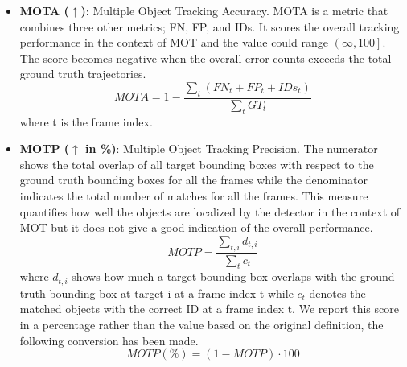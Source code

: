 \begin{itemize}
\item \textbf{MOTA ($\uparrow$)}: Multiple Object Tracking Accuracy. MOTA is a metric that combines three other metrics; FN, FP, and IDs. It scores the overall tracking performance in the context of MOT and the value could range $\left( \infty, 100 \right]$. The score becomes negative when the overall error counts exceeds the total ground truth trajectories.
\begin{equation}
MOTA = 1 - \frac{\sum_{t} (FN_{t} + FP_{t} + IDs_{t})}{\sum_{t}GT_{t}}
\label{eqn:MOTA}
\end{equation}
where t is the frame index.

\item \textbf{MOTP ($\uparrow$ in \%)}: Multiple Object Tracking Precision. The numerator shows the total overlap of all target bounding boxes with respect to the ground truth bounding boxes for all the frames while the denominator indicates the total number of matches for all the frames. This measure quantifies how well the objects are localized by the detector in the context of MOT but it does not give a good indication of the overall performance.
\begin{equation} 
MOTP = \frac{\sum_{t,i} d_{t,i}}{\sum_{t}c_{t}}
\label{eqn:MOTP}
\end{equation}
where $d_{t,i}$ shows how much a target bounding box overlaps with the ground truth bounding box at target i at a frame index t while $c_{t}$ denotes the matched objects with the correct ID at a frame index t. We report this score in a percentage rather than the value based on the original definition, the following conversion has been made.
\begin{equation} 
MOTP (\%) = (1 - MOTP) \cdot 100
\label{eqn:MOTP_percentage}
\end{equation}

\end{itemize}


